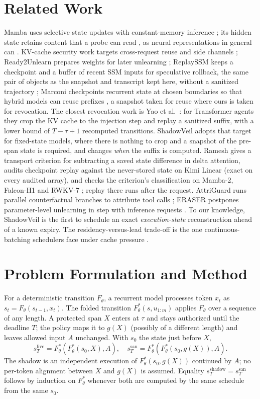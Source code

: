 \documentclass[conference]{IEEEtran}
\begin{document}
\section{Related Work}
Mamba uses selective state updates with constant-memory inference \cite{mamba,mamba2}; its hidden state
retains content that a probe can read \cite{mambamemory}, as neural representations in general can
\cite{coavoux,embeddings}. KV-cache security work targets cross-request reuse and side channels
\cite{cacheprune,shadowcache}; Ready2Unlearn prepares weights for later unlearning \cite{ready2unlearn};
ReplaySSM keeps a checkpoint and a buffer of recent SSM inputs for speculative rollback, the same pair of objects as the snapshot and transcript kept here, without a sanitized trajectory \cite{replayssm}; Marconi checkpoints recurrent state at chosen boundaries so that hybrid models can reuse prefixes \cite{marconi}, a snapshot taken for reuse where ours is taken for revocation.
The closest revocation work is Yao et al.\ \cite{executionunlearning}: for Transformer agents they crop the
KV cache to the injection step and replay a sanitized suffix, with a lower bound of $T{-}\tau{+}1$
recomputed transitions. ShadowVeil adopts that target for fixed-state models, where there is nothing to
crop and a snapshot of the pre-span state is required, and changes \emph{when} the suffix is computed.
Ramesh gives a transport criterion for subtracting a saved state difference in delta attention, audits checkpoint replay against the
never-stored state on Kimi Linear (exact on every audited array), and checks the criterion's classification on Mamba-2, Falcon-H1 and RWKV-7
\cite{deltaomission}; replay there runs after the request. AttriGuard runs parallel counterfactual branches to attribute tool calls
\cite{attriguard}; ERASER postpones parameter-level unlearning in step with inference requests \cite{eraser}.
To our knowledge, ShadowVeil is the first to schedule an exact \emph{execution-state} reconstruction ahead of a known expiry. The residency-versus-lead trade-off is the one continuous-batching
schedulers face under cache pressure \cite{congestion}.

\section{Problem Formulation and Method}
For a deterministic transition $F_\theta$, a recurrent model processes token $x_t$ as
$s_t=F_\theta(s_{t-1},x_t)$. The folded transition $F_\theta^*(s,u_{1:m})$ applies $F_\theta$ over a
sequence of any length. A protected span $X$ enters at $\tau$ and stays authorized until the deadline $T$;
the policy maps it to $g(X)$ (possibly of a different length) and leaves allowed input $A$ unchanged. With
$s_0$ the state just before $X$,
\begin{equation}
 s_T^{\mathrm{live}}=F_\theta^*(F_\theta^*(s_0,X),A), \quad
 s_T^{\mathrm{san}}=F_\theta^*(F_\theta^*(s_0,g(X)),A).
\end{equation}
The shadow is an independent execution of $F_\theta^*(s_0,g(X))$ continued by $A$; no per-token alignment
between $X$ and $g(X)$ is assumed. Equality $s_T^{\mathrm{shadow}}=s_T^{\mathrm{san}}$ follows by induction on
$F_\theta^*$ whenever both are computed by the same schedule from the same $s_0$.
\end{document}
